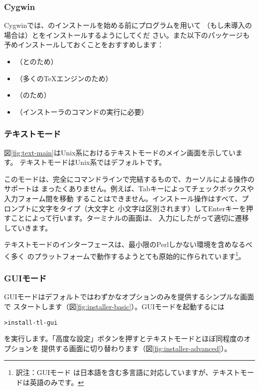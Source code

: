 \documentclass[uplatex,dvipdfmx,12pt,tombow]{jsarticle}
\begin{document}
\subsubsection{Cygwin}
\label{sec:cygwin}

Cygwinでは、\TL のインストールを始める前にプログラムを用いて
（もし未導入の場合は）とをインストールするようにしてくだ
さい。また以下のパッケージも予めインストールしておくことをおすすめします：
%
\begin{itemize}
\item {}（\XeTeX と\LuaTeX のため）
\item {}（多くの\TeX エンジンのため）
\item {}（のため）
\item {}（インストーラのコマンドの実行に必要）
\end{itemize}

\subsubsection{テキストモード}

図\ref{fig:text-main}はUnix系におけるテキストモードのメイン画面を示しています。
テキストモードはUnix系ではデフォルトです。

このモードは、完全にコマンドラインで完結するもので、カーソルによる操作のサポートは
まったくありません。例えば、Tabキーによってチェックボックスや入力フォーム間を移動
することはできません。インストール操作はすべて、プロンプトに文字をタイプ（大文字と
小文字は区別されます）してEnterキーを押すことによって行います。ターミナルの画面は、
入力にしたがって適切に遷移していきます。

テキストモードのインターフェースは、最小限のPerlしかない環境を含めなるべく多く
のプラットフォームで動作するようとても原始的に作られています\footnote{訳注：GUIモード
は日本語を含む多言語に対応していますが、テキストモードは英語のみです。}。

\subsubsection{GUIモード}
\label{sec:graphical-inst}

GUIモードはデフォルトではわずかなオプションのみを提供するシンプルな画面で
スタートします（図\ref{fig:installer-basic}）。GUIモードを起動するには
%
\begin{alltt}
> install-tl -gui
\end{alltt}
%
を実行します。「高度な設定」ボタンを押すとテキストモードとほぼ同程度のオプションを
提供する画面に切り替わります（図\ref{fig:installer-advanced}）。
\end{document}
